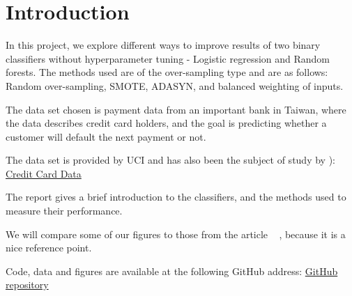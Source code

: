 \section{Introduction}
In this project, we explore different ways to improve results of two binary
classifiers without hyperparameter tuning - Logistic regression and
Random forests. The methods used are of the over-sampling type and are as
follows: Random over-sampling, SMOTE, ADASYN, and balanced weighting of
inputs.

The data set chosen is payment
data from an important bank in Taiwan, where the data describes credit card 
holders, and the goal is predicting whether a customer will default the 
next payment or not.

The data set is provided by UCI and has also been the subject of study by \cite{ComparisonData}): 
\href{https://archive.ics.uci.edu/ml/datasets/default+of+credit+card+clients}{Credit Card Data}

The report gives a brief introduction to the classifiers, and the methods
used to measure their performance.

We will compare some of our figures to those from the article ~\cite{ComparisonData}
, because it is
a nice reference point. 

Code, data and figures are available at the following GitHub address:
\href{https://github.com/geirtul/fys-stk4155/tree/master/project3}{GitHub repository}



